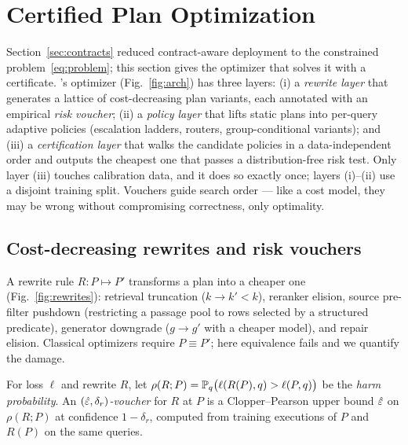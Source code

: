 \section{Certified Plan Optimization}
\label{sec:optimizer}



Section~\ref{sec:contracts} reduced contract-aware deployment to the
constrained problem~\eqref{eq:problem}; this section gives the optimizer
that solves it with a certificate.
\system's optimizer (Fig.~\ref{fig:arch}) has three layers: (i) a
\emph{rewrite layer} that generates a lattice of cost-decreasing plan
variants, each annotated with an empirical \emph{risk voucher}; (ii) a
\emph{policy layer} that lifts static plans into per-query adaptive
policies (escalation ladders, routers, group-conditional variants); and
(iii) a \emph{certification layer} that walks the candidate policies in a
data-independent order and outputs the cheapest one that passes a
distribution-free risk test. Only layer (iii) touches calibration data, and
it does so exactly once; layers (i)--(ii) use a disjoint training split.
Vouchers guide search order --- like a cost model, they may be wrong without
compromising correctness, only optimality.

\subsection{Cost-decreasing rewrites and risk vouchers}
\label{sec:rewrites}



A rewrite rule $R : P \mapsto P'$ transforms a plan into a cheaper one
(Fig.~\ref{fig:rewrites}):
retrieval truncation ($k \to k' < k$), reranker elision, source pre-filter
pushdown (restricting a passage pool to rows selected by a structured
predicate), generator downgrade ($g \to g'$ with a cheaper model), and
repair elision. Classical optimizers require $P \equiv P'$; here
equivalence fails and we quantify the damage.

\begin{definition}
\label{def:voucher}
For loss $\ell$ and rewrite $R$, let
$\rho(R; P) = \mathbb{P}_{q}\big(\ell(R(P), q) > \ell(P, q)\big)$ be the
\emph{harm probability}. An \emph{$(\hat{\varepsilon}, \delta_r)$-voucher} for $R$ at
$P$ is a Clopper--Pearson upper bound $\hat{\varepsilon}$ on $\rho(R;P)$ at
confidence $1-\delta_r$, computed from training executions of $P$ and
$R(P)$ on the same queries.
\end{definition}

